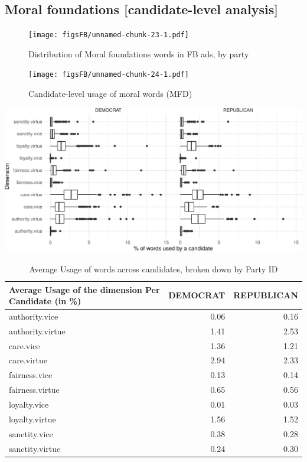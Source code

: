 \documentclass[
  12pt,
]{article}
\begin{document}
\clearpage
\pagebreak

\hypertarget{moral-foundations-candidate-level-analysis}{%
\subsection{Moral foundations {[}candidate-level analysis{]}}\label{moral-foundations-candidate-level-analysis}}

\begin{figure}
\centering
\texttt{[image: figsFB/unnamed-chunk-23-1.pdf]}
\caption{\label{fig:unnamed-chunk-23}Distribution of Moral foundations words in FB ads, by party}
\end{figure}

\begin{figure}
\centering
\texttt{[image: figsFB/unnamed-chunk-24-1.pdf]}
\caption{\label{fig:unnamed-chunk-24}Candidate-level usage of moral words (MFD)}
\end{figure}

\includegraphics{figsFB/Candidate-level usage of moral words (MFD)-1.pdf}

\begin{table}

\caption{\label{tab:unnamed-chunk-25}Average Usage of words across candidates, broken down by Party ID}
\centering
\begin{tabular}[t]{lrr}
\toprule
Average Usage of the dimension Per Candidate (in \%) & DEMOCRAT & REPUBLICAN\\
\midrule
authority.vice & 0.06 & 0.16\\
authority.virtue & 1.41 & 2.53\\
care.vice & 1.36 & 1.21\\
care.virtue & 2.94 & 2.33\\
fairness.vice & 0.13 & 0.14\\
\addlinespace
fairness.virtue & 0.65 & 0.56\\
loyalty.vice & 0.01 & 0.03\\
loyalty.virtue & 1.56 & 1.52\\
sanctity.vice & 0.38 & 0.28\\
sanctity.virtue & 0.24 & 0.30\\
\bottomrule
\end{tabular}
\end{table}
\end{document}
